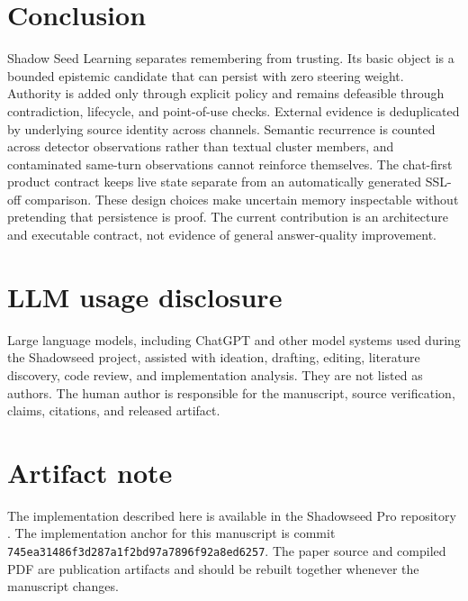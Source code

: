 \documentclass[11pt]{article}
\newcommand{\implcommit}{\nolinkurl{745ea31486f3d287a1f2bd97a7896f92a8ed6257}}
\begin{document}
\section{Conclusion}

Shadow Seed Learning separates remembering from trusting. Its basic object is a bounded epistemic candidate that can persist with zero steering weight. Authority is added only through explicit policy and remains defeasible through contradiction, lifecycle, and point-of-use checks. External evidence is deduplicated by underlying source identity across channels. Semantic recurrence is counted across detector observations rather than textual cluster members, and contaminated same-turn observations cannot reinforce themselves. The chat-first product contract keeps live state separate from an automatically generated SSL-off comparison. These design choices make uncertain memory inspectable without pretending that persistence is proof. The current contribution is an architecture and executable contract, not evidence of general answer-quality improvement.

\section*{LLM usage disclosure}
Large language models, including ChatGPT and other model systems used during the Shadowseed project, assisted with ideation, drafting, editing, literature discovery, code review, and implementation analysis. They are not listed as authors. The human author is responsible for the manuscript, source verification, claims, citations, and released artifact.

\section*{Artifact note}
The implementation described here is available in the Shadowseed Pro repository \citep{shadowseed2026}. The implementation anchor for this manuscript is commit \implcommit{}. The paper source and compiled PDF are publication artifacts and should be rebuilt together whenever the manuscript changes.

\printbibliography
\end{document}

